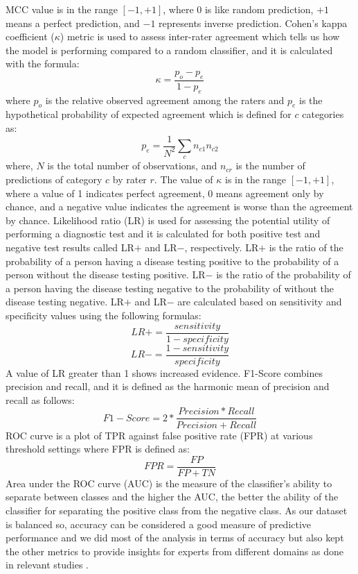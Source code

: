 MCC value is in the range $\left[ -1,+1\right]$, where 0 is like random prediction, $+1$ means a perfect prediction, and $-1$ represents inverse prediction. Cohen’s kappa coefficient ($\kappa$) metric is used to assess inter-rater agreement which tells us how the model is performing compared to a random classifier, and it is calculated with the formula:
\begin{equation}
	\kappa=\frac{p_o-p_e}{1-p_e}
\end{equation}
where $p_o$ is the relative observed agreement among the raters and $p_e$ is the hypothetical probability of expected agreement which is defined for $c$ categories as:
\begin{equation}
	p_e=\frac{1}{N^2} \sum_c n_{c 1} n_{c 2}
\end{equation}
where, $N$ is the total number of observations, and $n_{cr}$ is the number of predictions of category $c$ by rater $r$. The value of $\kappa$ is in the range $\left[ -1,+1\right]$, where a value of 1 indicates perfect agreement, 0 means agreement only by chance, and a negative value indicates the agreement is worse than the agreement by chance. Likelihood ratio (LR) is used for assessing the potential utility of performing a diagnostic test and it is calculated for both positive test and negative test results called LR$+$ and LR$-$, respectively. LR$+$ is the ratio of the probability of a person having a disease testing positive to the probability of a person without the disease testing positive. LR$-$ is the ratio of the probability of a person having the disease testing negative to the probability of without the disease testing negative. LR$+$ and LR$-$ are calculated based on sensitivity and specificity values using the following formulas:
\begin{equation}
	LR+ =\frac{sensitivity}{1-specificity}
\end{equation}
\begin{equation}
	LR- =\frac{1-sensitivity}{specificity}
\end{equation}
A value of LR greater than 1 shows increased evidence. F1-Score combines precision and recall, and it is defined as the harmonic mean of precision and recall as follows:
\begin{equation}
	F1-Score=2 * \frac{ Precision  *  Recall }{Precision+ Recall}
\end{equation}
ROC curve is a plot of TPR against false positive rate (FPR) at various threshold settings where FPR is defined as: 
\begin{equation}
	FPR =\frac{FP}{FP+TN}
\end{equation}
Area under the ROC curve (AUC) is the measure of the classifier’s ability to separate between classes and the higher the AUC, the better the ability of the classifier for separating the positive class from the negative class. As our dataset is balanced so, accuracy can be considered a good measure of predictive performance \cite{Chicco2020} and we did most of the analysis in terms of accuracy but also kept the other metrics to provide insights for experts from different domains as done in relevant studies \cite{Burlina2018,Burlina2020}. 


